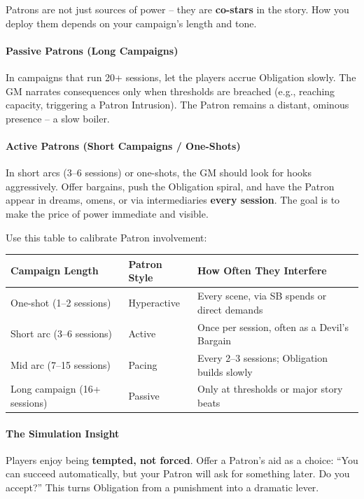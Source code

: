 Patrons are not just sources of power -- they are \textbf{co-stars} in the story. How you deploy them depends on your campaign's length and tone.

\paragraph{Passive Patrons (Long Campaigns)}
In campaigns that run 20+ sessions, let the players accrue Obligation slowly. The GM narrates consequences only when thresholds are breached (e.g., reaching capacity, triggering a Patron Intrusion). The Patron remains a distant, ominous presence -- a slow boiler.

\paragraph{Active Patrons (Short Campaigns / One-Shots)}
In short arcs (3--6 sessions) or one-shots, the GM should look for hooks aggressively. Offer bargains, push the Obligation spiral, and have the Patron appear in dreams, omens, or via intermediaries \textbf{every session}. The goal is to make the price of power immediate and visible.

Use this table to calibrate Patron involvement:

\begin{center}
\begin{tabular}{lll}
\toprule
\textbf{Campaign Length} & \textbf{Patron Style} & \textbf{How Often They Interfere} \\
\midrule
One-shot (1--2 sessions) & Hyperactive & Every scene, via SB spends or direct demands \\
Short arc (3--6 sessions) & Active & Once per session, often as a Devil's Bargain \\
Mid arc (7--15 sessions) & Pacing & Every 2--3 sessions; Obligation builds slowly \\
Long campaign (16+ sessions) & Passive & Only at thresholds or major story beats \\
\bottomrule
\end{tabular}
\end{center}

\paragraph{The Simulation Insight}
Players enjoy being \textbf{tempted, not forced}. Offer a Patron's aid as a choice: ``You can succeed automatically, but your Patron will ask for something later. Do you accept?'' This turns Obligation from a punishment into a dramatic lever.


